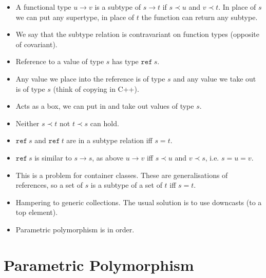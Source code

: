 \begin{itemize}

\item A functional type $u \rightarrow v$ is a subtype of $s \rightarrow t$ if
$s \prec u$ and $v \prec t$. In place of $s$ we can put any supertype, in place
of $t$ the function can return any subtype.

\item We say that the subtype relation is contravariant on function types
(opposite of covariant).

\item Reference to a value of type $s$ has type $\mathtt{ref}\ s$.

\item Any value we place into the reference is of type $s$ and any value we
take out is of type $s$ (think of copying in C++).

\item Acts as a box, we can put in and take out values of type $s$.

\item Neither $s \prec t$ not $t \prec s$ can hold.

\item $\mathtt{ref}\ s$ and $\mathtt{ref}\ t$ are in a subtype relation iff
$s=t$.

\item $\mathtt{ref}\ s$ is similar to $s \rightarrow s$, as above $u
\rightarrow v$ iff $s \prec u$ and $v \prec s$, i.e. $s=u=v$.

\item This is a problem for container classes. These are generalisations of
references, so a set of $s$ is a subtype of a set of $t$ iff $s=t$.

\item Hampering to generic collections. The usual solution is to use downcasts
(to a top element).

\item Parametric polymorphism is in order.

\end{itemize}

\section{Parametric Polymorphism}


